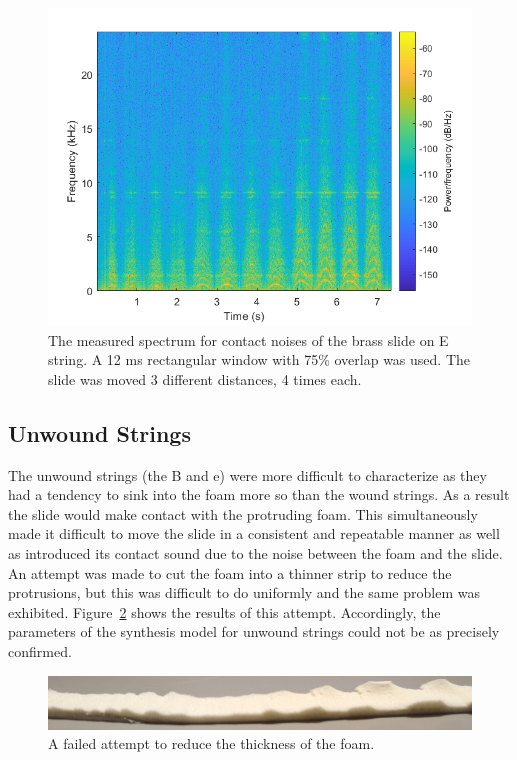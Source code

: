 \documentclass[../main.tex]{subfiles}
\begin{document}
\begin{figure}[h]
    \centering
    \includegraphics[scale=.65]{./images/plots/ContactNoiseEBrass.png}
    \caption{The measured spectrum for contact noises of the brass slide on E string. A 12 ms rectangular window with 75\% overlap was used. The slide was moved 3 different distances, 4 times each.}
    \label{fig:ContactNoiseEBrass}
\end{figure}

\subsection{Unwound Strings}
The unwound strings (the B and e) were more difficult to characterize as they had a tendency to sink into the foam more so than the wound strings. As a result the slide would make contact with the protruding foam. This simultaneously made it difficult to move the slide in a consistent and repeatable manner as well as introduced its contact sound due to the noise between the foam and the slide. An attempt was made to cut the foam into a thinner strip to reduce the protrusions, but this was difficult to do uniformly and the same problem was exhibited. Figure~\ref{fig:CutFoam} shows the results of this attempt. Accordingly, the parameters of the synthesis model for unwound strings could not be as precisely confirmed.

\begin{figure}[h]
    \centering
    \includegraphics[scale=1]{./images/pictures/CutFoam.png}
    \caption{A failed attempt to reduce the thickness of the foam.}
    \label{fig:CutFoam}
\end{figure}
\end{document}
